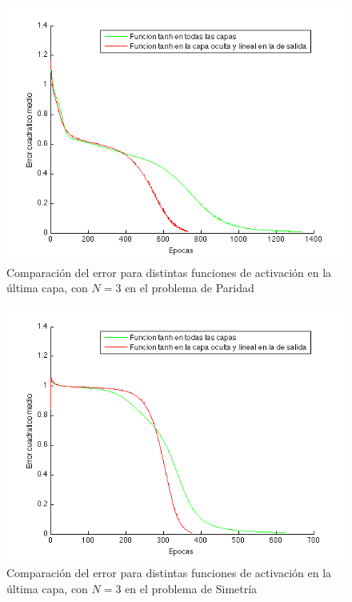 \documentclass{sig-alternate}
\begin{document}
\begin{figure}[!ht]
	\includegraphics[scale=0.5]{./images/tanhAllVsTanhAndLineal.png}
  \caption{Comparaci\'on del error para distintas funciones de activaci\'on en la \'ultima capa, con $N = 3$ en el problema de Paridad}
  \label{fig:tanhAllVsLinealLast}
\end{figure}


\begin{figure}[!ht]
	\includegraphics[scale=0.5]{./images/tanhAllVsTanhAndLinealSymetric.png}
  \caption{Comparaci\'on del error para distintas funciones de activaci\'on en la \'ultima capa, con $N = 3$ en el problema de Simetr\'ia}
  \label{fig:tanhAllVsLinealLastSymetric}
\end{figure}
\end{document}
